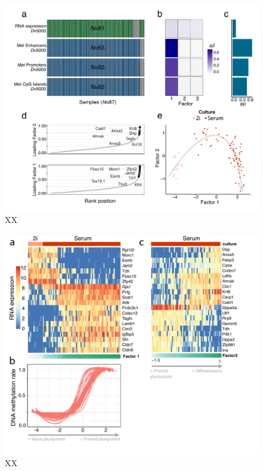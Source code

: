 \begin{figure}[H]
	\centering 	
	\includegraphics[width=1.0\textwidth]{MOFA_scMT}
	\caption{XX}
	\label{fig:MOFA_scMT}
\end{figure}

\begin{figure}[H]
	\centering 	
	\includegraphics[width=1.0\textwidth]{MOFA_scMT2}
	\caption{XX}
	\label{fig:MOFA_scMT2}
\end{figure}

